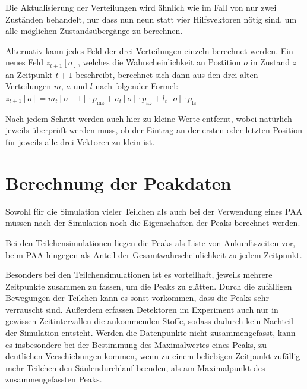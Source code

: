 Die Aktualisierung der Verteilungen wird ähnlich wie im Fall von nur zwei Zuständen behandelt, nur dass nun neun statt vier Hilfsvektoren nötig sind, um alle möglichen Zustandsübergänge zu berechnen. 

Alternativ kann jedes Feld der drei Verteilungen einzeln berechnet werden. Ein neues Feld $z_{t+1}[o]$, welches die Wahrscheinlichkeit an Postition $o$ in Zustand $z$ an Zeitpunkt $t+1$ beschreibt, berechnet sich dann aus den drei alten Verteilungen $m$, $a$ und $l$ nach folgender Formel:
$z_{t+1}[o] = m_t[o-1] \cdot p_{\text{m}z} + a_t[o] \cdot p_{\text{a}z} + l_t[o] \cdot p_{\text{l}z} $


Nach jedem Schritt werden auch hier zu kleine Werte entfernt, wobei natürlich jeweils überprüft werden muss, ob der Eintrag an der ersten oder letzten Position für jeweils alle drei Vektoren zu klein ist.

% 


\section{Berechnung der Peakdaten}
Sowohl für die Simulation vieler Teilchen als auch bei der Verwendung eines PAA müssen nach der Simulation noch die Eigenschaften der Peaks berechnet werden. 

Bei den Teilchensimulationen liegen die Peaks als Liste von Ankunftszeiten vor, beim PAA hingegen als Anteil der Gesamtwahrscheinlichkeit zu jedem Zeitpunkt. 

Besonders bei den Teilchensimulationen ist es vorteilhaft, jeweils mehrere Zeitpunkte zusammen zu fassen, um die Peaks zu glätten. Durch die zufälligen Bewegungen der Teilchen kann es sonst vorkommen, dass die Peaks sehr verrauscht sind. Außerdem erfassen Detektoren im Experiment auch nur in gewissen Zeitintervallen die ankommenden Stoffe, sodass dadurch kein Nachteil der Simulation entsteht.
Werden die Datenpunkte nicht zusammengefasst, kann es insbesondere bei der Bestimmung des Maximalwertes eines Peaks, zu deutlichen Verschiebungen kommen, wenn zu einem beliebigen Zeitpunkt zufällig mehr Teilchen den Säulendurchlauf beenden, als am Maximalpunkt des zusammengefassten Peaks.

